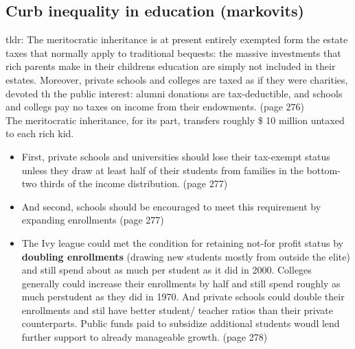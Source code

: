 \documentclass[11pt]{article}
\begin{document}
\subsection{Curb inequality in education (markovits)}
tldr: The meritocratic inheritance is at present entirely exempted form the estate taxes that normally apply to traditional bequests: the massive investments that rich parents make in their childrens education are simply not included in their estates. Moreover, private schools and colleges are taxed as if they were charities, devoted th the public interest: alumni donations are tax-deductible, and schools and collegs pay no taxes on income from their endowments. (page 276)
\\ The meritocratic inheritance, for its part, transfers roughly \$ 10 million untaxed to each rich kid.
\begin{itemize}
 \item First, private schools and universities should lose their tax-exempt status unless they draw at least half of their students from families in the bottom-two thirds of the income distribution. (page 277)
 \item And second, schools should be encouraged to meet this requirement by expanding enrollments (page 277)
 \item The Ivy league could met the condition for retaining not-for profit status by \textbf{doubling enrollments} (drawing new students mostly from outside the elite) and still spend about as much per student as it did in 2000. Colleges generally could increase their enrollments by half and still spend roughly as much perstudent as they did in 1970. And private schools could double their enrollments and stil have better student/ teacher ratios than their private counterparts. Public funds paid to subsidize additional students woudl lend further support to already manageable growth. (page 278)
\end{itemize}
\end{document}
